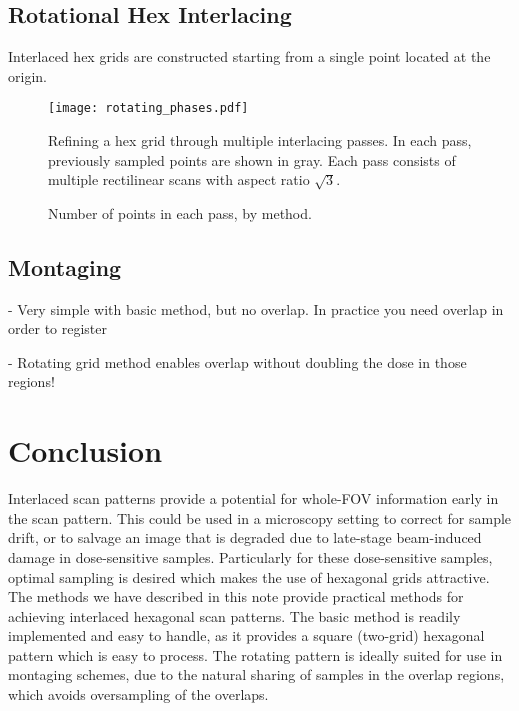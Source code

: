 \documentclass{article}
\begin{document}
\subsection{Rotational Hex Interlacing}
\label{triple-grid-interlacing}

Interlaced hex grids are constructed starting from a single point
located at the origin.

\begin{figure}[ht]
\centering
\texttt{[image: rotating\_phases.pdf]}
\caption{
\label{fig:rotatingphases} Refining a hex grid through multiple interlacing passes.
%
In each pass, previously sampled points are shown in gray.
%
Each pass consists of multiple rectilinear scans with aspect ratio $\sqrt{3}$.
}
\end{figure}

\begin{figure}[ht]
\caption{\label{fig:passsizes} Number of points in each pass, by method.}
\end{figure}

\subsection{Montaging}
\label{sec:montaging}

- Very simple with basic method, but no overlap. In practice you need overlap in order to register

- Rotating grid method enables overlap without doubling the dose in those regions!

\section{Conclusion}
\label{sec:conclusion}

Interlaced scan patterns provide a potential for whole-FOV information early in the scan pattern.
%
This could be used in a microscopy setting to correct for sample drift, or to salvage an image that is degraded due to late-stage beam-induced damage in dose-sensitive samples.
%
Particularly for these dose-sensitive samples, optimal sampling is desired which makes the use of hexagonal grids attractive.
%
The methods we have described in this note provide practical methods for achieving interlaced hexagonal scan patterns.
%
The basic method is readily implemented and easy to handle, as it provides a square (two-grid) hexagonal pattern which is easy to process.
%
The rotating pattern is ideally suited for use in montaging schemes, due to the natural sharing of samples in the overlap regions, which avoids oversampling of the overlaps.



\end{document}

